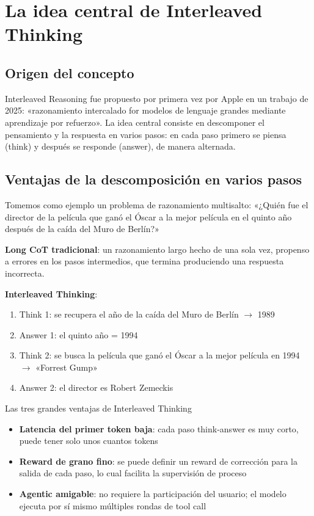 \section{La idea central de Interleaved Thinking}

\subsection{Origen del concepto}

Interleaved Reasoning fue propuesto por primera vez por Apple en un trabajo de 2025: «razonamiento intercalado for modelos de lenguaje grandes mediante aprendizaje por refuerzo». La idea central consiste en descomponer el pensamiento y la respuesta en varios pasos: en cada paso primero se piensa (think) y después se responde (answer), de manera alternada.

\subsection{Ventajas de la descomposición en varios pasos}

Tomemos como ejemplo un problema de razonamiento multisalto: «¿Quién fue el director de la película que ganó el Óscar a la mejor película en el quinto año después de la caída del Muro de Berlín?»

\textbf{Long CoT tradicional}: un razonamiento largo hecho de una sola vez, propenso a errores en los pasos intermedios, que termina produciendo una respuesta incorrecta.

\textbf{Interleaved Thinking}:
\begin{enumerate}
  \item Think 1: se recupera el año de la caída del Muro de Berlín $\to$ 1989
  \item Answer 1: el quinto año = 1994
  \item Think 2: se busca la película que ganó el Óscar a la mejor película en 1994 $\to$ «Forrest Gump»
  \item Answer 2: el director es Robert Zemeckis
\end{enumerate}

\begin{importantbox}{Las tres grandes ventajas de Interleaved Thinking}
\begin{itemize}
  \item \textbf{Latencia del primer token baja}: cada paso think-answer es muy corto, puede tener solo unos cuantos tokens
  \item \textbf{Reward de grano fino}: se puede definir un reward de corrección para la salida de cada paso, lo cual facilita la supervisión de proceso
  \item \textbf{Agentic amigable}: no requiere la participación del usuario; el modelo ejecuta por sí mismo múltiples rondas de tool call
\end{itemize}
\end{importantbox}

